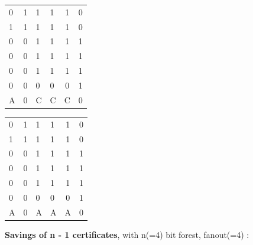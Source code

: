 	\begin{multicols}{2}

		\begin{tabular}{ l l |l l c r }
		  0 & 1 & 1 & 1 & 1 & 0 \\
		  1 & 1 & 1 & 1 & 1 & 0 \\
		  \hline
		  0 & 0 & 1 & 1 & 1 & 1 \\
		  0 & 0 & 1 & 1 & 1 & 1 \\
		  0 & 0 & 1 & 1 & 1 & 1 \\
		  0 & 0 & 0 & 0 & 0 & 1 \\
		  \hline	
		  A & 0 & C & C & C & 0 \\
		\end{tabular}
	\columnbreak{|}
		\begin{tabular}{ l l | l l c r }
		  0 & 1 & 1 & 1 & 1 & 0 \\
		  1 & 1 & 1 & 1 & 1 & 0 \\
		  \hline
		  0 & 0 & 1 & 1 & 1 & 1 \\
		  0 & 0 & 1 & 1 & 1 & 1 \\
		  0 & 0 & 1 & 1 & 1 & 1 \\
		  0 & 0 & 0 & 0 & 0 & 1 \\
		  \hline
		  A & 0 & A & A & A & 0\\

		\end{tabular}

	\end{multicols}

	\textbf{Savings of n - 1 certificates}, with n(=4) bit forest, fanout(=4) :

